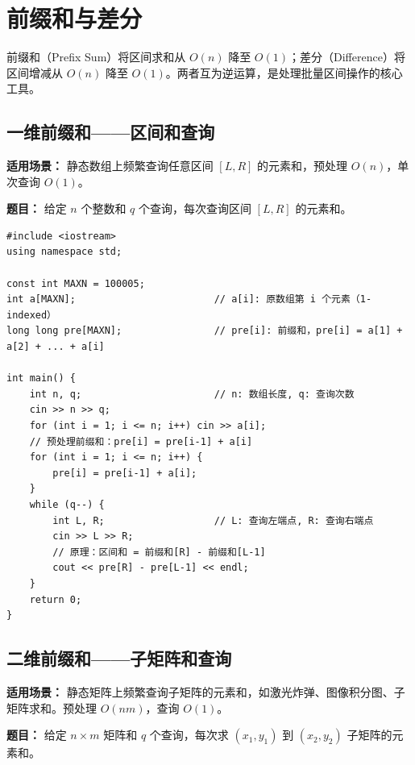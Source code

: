 \documentclass[12pt,a4paper]{ctexart}
\begin{document}
\newpage

\section{前缀和与差分}
前缀和（Prefix Sum）将区间求和从 $O(n)$ 降至 $O(1)$；差分（Difference）将区间增减从 $O(n)$ 降至 $O(1)$。两者互为逆运算，是处理批量区间操作的核心工具。

\subsection{一维前缀和——区间和查询}
\textbf{适用场景：} 静态数组上频繁查询任意区间 $[L,R]$ 的元素和，预处理 $O(n)$，单次查询 $O(1)$。

\textbf{题目：} 给定 $n$ 个整数和 $q$ 个查询，每次查询区间 $[L,R]$ 的元素和。

\begin{lstlisting}[caption={一维前缀和——O(1) 区间和查询}]
#include <iostream>
using namespace std;

const int MAXN = 100005;
int a[MAXN];                        // a[i]: 原数组第 i 个元素（1-indexed）
long long pre[MAXN];                // pre[i]: 前缀和，pre[i] = a[1] + a[2] + ... + a[i]

int main() {
    int n, q;                       // n: 数组长度, q: 查询次数
    cin >> n >> q;
    for (int i = 1; i <= n; i++) cin >> a[i];
    // 预处理前缀和：pre[i] = pre[i-1] + a[i]
    for (int i = 1; i <= n; i++) {
        pre[i] = pre[i-1] + a[i];
    }
    while (q--) {
        int L, R;                   // L: 查询左端点, R: 查询右端点
        cin >> L >> R;
        // 原理：区间和 = 前缀和[R] - 前缀和[L-1]
        cout << pre[R] - pre[L-1] << endl;
    }
    return 0;
}
\end{lstlisting}

\subsection{二维前缀和——子矩阵和查询}
\textbf{适用场景：} 静态矩阵上频繁查询子矩阵的元素和，如激光炸弹、图像积分图、子矩阵求和。预处理 $O(nm)$，查询 $O(1)$。

\textbf{题目：} 给定 $n \times m$ 矩阵和 $q$ 个查询，每次求 $(x_1,y_1)$ 到 $(x_2,y_2)$ 子矩阵的元素和。
\end{document}
